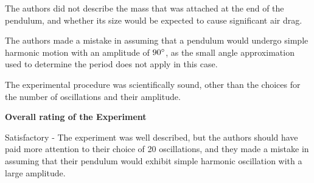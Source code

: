 The authors did not describe the mass that was attached at the end of the pendulum, and whether its size would be expected to cause significant air drag.

The authors made a mistake in assuming that a pendulum would undergo simple harmonic motion with an amplitude of $90 {\rm \degree}$, as the small angle approximation used to determine the period does not apply in this case.

The experimental procedure was scientifically sound, other than the choices for the number of oscillations and their amplitude.

\textbf{Overall rating of the Experiment}

Satisfactory - The experiment was well described, but the authors should have paid more attention to their choice of 20 oscillations, and they made a mistake in assuming that their pendulum would exhibit simple harmonic oscillation with a large amplitude.